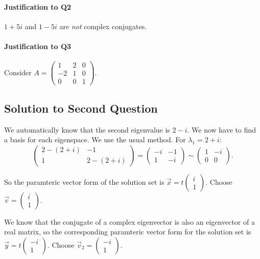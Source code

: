 	\paragraph{Justification to Q2} \(1 + 5i\) and \(1 - 5i\) are \emph{not} complex conjugates.

	\paragraph{Justification to Q3} Consider \(A = \begin{pmatrix}1 & 2 & 0 \\ -2 & 1 & 0 \\ 0 & 0 & 1\end{pmatrix}\).

	\subsection{Solution to Second Question}
	We automatically know that the second eigenvalue is \(2 - i\). We now have to find a basis for each eigenspace. We use the usual method. For \(\lambda_1 = 2 + i\):
	\[\begin{pmatrix}2 - (2 + i) & -1 \\ 1 & 2 - (2 + i)\end{pmatrix} = \begin{pmatrix}-i & -1 \\ 1 & -i\end{pmatrix} \sim \begin{pmatrix} 1 & -i \\ 0 & 0\end{pmatrix}.\] 

	So the paramteric vector form of the solution set is \(\vec{x} = t\begin{pmatrix}i \\ 1\end{pmatrix}\). Choose \(\vec{v} = \begin{pmatrix}i \\ 1\end{pmatrix}\).

	We know that the conjugate of a complex eigenvector is also an eigenvector of a real matrix, so the corresponding paramteric vector form for the solution set is 
	\(\vec{y} = t\begin{pmatrix}-i \\ 1\end{pmatrix}\). Choose \(\vec{v}_2 = \begin{pmatrix}-i \\ 1\end{pmatrix}\).